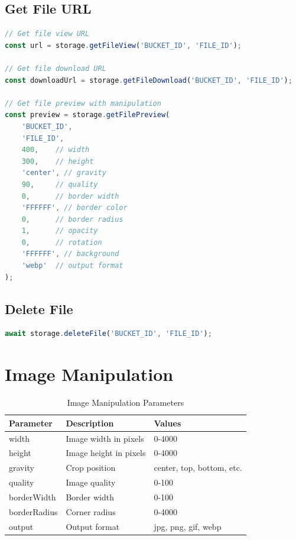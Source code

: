\documentclass[11pt,a4paper,oneside]{book}
\begin{document}
\subsection{Get File URL}

\begin{lstlisting}[language=JavaScript, caption=Getting File URL]
// Get file view URL
const url = storage.getFileView('BUCKET_ID', 'FILE_ID');

// Get file download URL
const downloadUrl = storage.getFileDownload('BUCKET_ID', 'FILE_ID');

// Get file preview with manipulation
const preview = storage.getFilePreview(
    'BUCKET_ID',
    'FILE_ID',
    400,    // width
    300,    // height
    'center', // gravity
    90,     // quality
    0,      // border width
    'FFFFFF', // border color
    0,      // border radius
    1,      // opacity
    0,      // rotation
    'FFFFFF', // background
    'webp'  // output format
);
\end{lstlisting}

\subsection{Delete File}

\begin{lstlisting}[language=JavaScript, caption=Deleting a File]
await storage.deleteFile('BUCKET_ID', 'FILE_ID');
\end{lstlisting}

\section{Image Manipulation}

\begin{table}[h]
\centering
\begin{tabularx}{\textwidth}{l X l}
\toprule
\textbf{Parameter} & \textbf{Description} & \textbf{Values} \\
\midrule
width & Image width in pixels & 0-4000 \\
height & Image height in pixels & 0-4000 \\
gravity & Crop position & center, top, bottom, etc. \\
quality & Image quality & 0-100 \\
borderWidth & Border width & 0-100 \\
borderRadius & Corner radius & 0-4000 \\
output & Output format & jpg, png, gif, webp \\
\bottomrule
\end{tabularx}
\caption{Image Manipulation Parameters}
\end{table}
\end{document}
